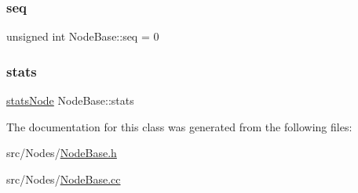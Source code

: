 \mbox{\label{class_node_base_a4fe5b1b7aeb49d15ec7986133346aeb7}} 
\subsubsection{\texorpdfstring{seq}{seq}}
{\footnotesize\ttfamily unsigned int Node\+Base\+::seq = 0\hspace{0.3cm}{\ttfamily [protected]}}

\mbox{\label{class_node_base_a12b20bca634637499bf55020c398424e}} 
\subsubsection{\texorpdfstring{stats}{stats}}
{\footnotesize\ttfamily \hyperlink{_node_base_8h_a6d83bdf09c8e309d31f9330091b0d10d}{stats\+Node} Node\+Base\+::stats\hspace{0.3cm}{\ttfamily [protected]}}



The documentation for this class was generated from the following files\+:\begin{DoxyCompactItemize}
\item 
src/\+Nodes/\hyperlink{_node_base_8h}{Node\+Base.\+h}\item 
src/\+Nodes/\hyperlink{_node_base_8cc}{Node\+Base.\+cc}\end{DoxyCompactItemize}
